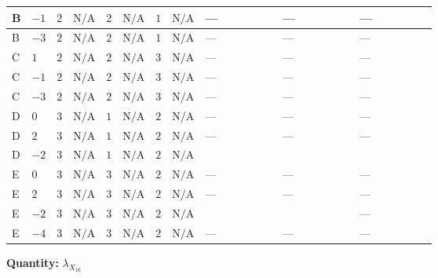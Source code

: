 \documentclass[8pt]{article}
\begin{document}
\begin{landscape}
\begin{longtable}{@{}llcccccc >{\raggedright\arraybackslash}p{0.21\linewidth} >{\raggedright\arraybackslash}p{0.21\linewidth} >{\raggedright\arraybackslash}p{0.21\linewidth}@{}}
\midrule
B & $-1$ & $2$ & $\text{N/A}$ & $2$ & $\text{N/A}$ & $1$ & $\text{N/A}$ & --- & --- & --- \\
\midrule
B & $-3$ & $2$ & $\text{N/A}$ & $2$ & $\text{N/A}$ & $1$ & $\text{N/A}$ & --- & --- & --- \\
\midrule
C & $1$ & $2$ & $\text{N/A}$ & $2$ & $\text{N/A}$ & $3$ & $\text{N/A}$ & --- & --- & --- \\
\midrule
C & $-1$ & $2$ & $\text{N/A}$ & $2$ & $\text{N/A}$ & $3$ & $\text{N/A}$ & --- & --- & --- \\
\midrule
C & $-3$ & $2$ & $\text{N/A}$ & $2$ & $\text{N/A}$ & $3$ & $\text{N/A}$ & --- & --- & --- \\
\midrule
D & $0$ & $3$ & $\text{N/A}$ & $1$ & $\text{N/A}$ & $2$ & $\text{N/A}$ & --- & --- & --- \\
\midrule
D & $2$ & $3$ & $\text{N/A}$ & $1$ & $\text{N/A}$ & $2$ & $\text{N/A}$ & --- & --- & --- \\
\midrule
D & $-2$ & $3$ & $\text{N/A}$ & $1$ & $\text{N/A}$ & $2$ & $\text{N/A}$ & \scriptsize\adjustbox{max width=\linewidth}{$\begin{gathered} -\frac{3 {g_1}^2 {\lambda_{X_{16}}}}{2}\end{gathered}$} & \scriptsize\adjustbox{max width=\linewidth}{$\begin{gathered} +6 {\lambda_1} {\lambda_{X_{16}}}\end{gathered}$} & \scriptsize\adjustbox{max width=\linewidth}{$\begin{gathered} +6 {\lambda_{HS_1}^{(1)}} {\lambda_{X_{7}}^{(1)}}\end{gathered}$} \\
\midrule
E & $0$ & $3$ & $\text{N/A}$ & $3$ & $\text{N/A}$ & $2$ & $\text{N/A}$ & --- & --- & --- \\
\midrule
E & $2$ & $3$ & $\text{N/A}$ & $3$ & $\text{N/A}$ & $2$ & $\text{N/A}$ & --- & --- & --- \\
\midrule
E & $-2$ & $3$ & $\text{N/A}$ & $3$ & $\text{N/A}$ & $2$ & $\text{N/A}$ & \scriptsize\adjustbox{max width=\linewidth}{$\begin{gathered} -\frac{3 {g_1}^2 {\lambda_{X_{16}}}}{2}\end{gathered}$} & \scriptsize\adjustbox{max width=\linewidth}{$\begin{gathered} +6 {\lambda_1} {\lambda_{X_{16}}}\end{gathered}$} & --- \\
\midrule
E & $-4$ & $3$ & $\text{N/A}$ & $3$ & $\text{N/A}$ & $2$ & $\text{N/A}$ & --- & --- & --- \\
\midrule
\bottomrule
\end{longtable}
\clearpage
\noindent\textbf{Quantity: }${\lambda_{X_{16}}}$\par\smallskip

\end{landscape}
\end{document}
